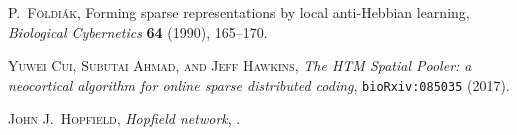 \documentclass[titlepage]{amsart}
\theoremstyle{definition}
\begin{document}
% 
% 
%

\begin{thebibliography}{14}



\textsc{P.\ F\"oldi\'ak},
Forming sparse representations by local anti-Hebbian learning,
\textit{Biological Cybernetics} \textbf{64} (1990), 165--170.


\textsc{Yuwei Cui, Subutai Ahmad, and Jeff Hawkins},
\textit{The HTM Spatial Pooler: a neocortical algorithm for online sparse distributed coding},
\texttt{bioRxiv:085035} (2017).


\textsc{John J.\ Hopfield},
\textit{Hopfield network},
.


\end{thebibliography}
%

\end{document}
